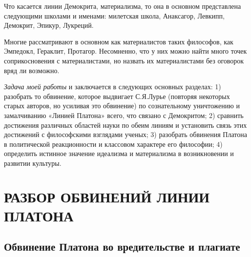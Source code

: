 Что  касается  линии  Демокрита,   материализма,  то  она  в  основном
представлена следующими школами и именами: милетская школа, Анаксагор,
Левкипп, Демокрит, Эпикур, Лукреций.

Многие рассматривают в основном как материалистов таких философов, как
Эмпедокл, Гераклит, Протагор. Несомненно, что  у них можно найти много
точек соприкосновения  с материалистами, но назвать  их материалистами
без оговорок вряд ли возможно.

\textit{Задача  моей  работы}  и   заключается  в  следующих  основных
разделах:  1)  разобрать  то обвинение,  которое  выдвигает  С.Я.Лурье
(повторяя  некоторых старых  авторов,  но усиливая  это обвинение)  по
сознательному уничтожению  и замалчиванию «Линией Платона»  всего, что
связано с Демокритом; 2)  сравнить достижения различных областей науки
по  обеим линиям  и установить  связь этих  достижений с  философскими
взглядами  ученых;  3)  разобрать  обвинения  Платона  в  политической
реакционности  и  классовом  характере его  философии;  4)  определить
истинное значение идеализма и  материализма в возникновении и развитии
культуры.

\clearpage

\section{РАЗБОР ОБВИНЕНИЙ ЛИНИИ ПЛАТОНА}

\subsection{Обвинение Платона во вредительстве и плагиате}

